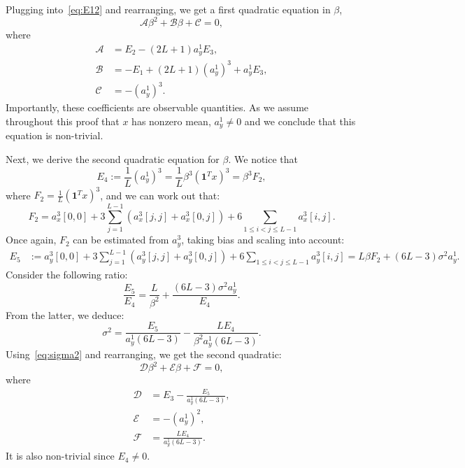 \documentclass[12pt]{article}
\newcommand{\1}{\mathbf{1}}
\newcommand{\one}{\mathbf{1}}
\theoremstyle{plain}
\theoremstyle{definition}
\theoremstyle{remark}
\theoremstyle{plain}
\theoremstyle{remark}
\theoremstyle{plain}
\theoremstyle{plain}
\begin{document}
Plugging into~\eqref{eq:E12} and rearranging, we get a first quadratic equation in $\beta$,
\begin{equation} \label{eq:quad1}
\mathcal{A}\beta^2 + \mathcal{B}\beta + \mathcal{C} = 0,
\end{equation}
where 
\begin{align*}
\mathcal{A} &= E_2 - (2L+1)a_y^1E_3, \\ 
\mathcal{B} &= -E_1 + (2L+1)(a_y^1)^3 + a_y^1E_3  , \\
\mathcal{C} &= -(a_y^1)^3.
\end{align*}
Importantly, these coefficients are observable quantities. As we assume throughout this proof that $x$ has nonzero mean, $a_y^1 \neq 0$ and we conclude that this equation is non-trivial.

Next, we derive the second quadratic equation for $\beta$. We notice that 
\begin{equation} \label{eq:E3}
E_4 := \frac{1}{L}(a_y^1)^3 = \frac{1}{L}\beta^3 (\one ^Tx)^3   = \beta^3 F_2,
\end{equation}
where $F_2 = \frac{1}{L}(\one ^Tx)^3$, and we can work out that:
\begin{equation*}
F_2 = a_x^3[0,0] + 3\sum_{j=1}^{L-1} \left(a_x^3[j,j] + a_x^3[0,j]\right) + 6\sum_{1\leq i < j\leq L-1}a_x^3[i,j].
\end{equation*}
Once again, $F_2$ can be estimated from $a_y^3$, taking bias and scaling into account:
\begin{align}
E_5 & := a_y^3[0,0] + 3\sum_{j=1}^{L-1} \left(a_y^3[j,j] + a_y^3[0,j]\right) + 6\sum_{1\leq i < j\leq L-1}a_y^3[i,j]  = L \beta F_2 + (6L-3)\sigma^2a_y^1.
\end{align}
Consider the following ratio:
\begin{equation*} 
\frac{E_5}{E_4} = \frac{L}{\beta^2} + \frac{(6L-3)\sigma^2a_y^1}{E_4}.
\end{equation*}
From the latter, we deduce:
\begin{equation*}
\sigma^2 = \frac{E_5}{a_y^1(6L-3)}  - \frac{LE_4}{\beta^2a_y^1(6L-3)}.
\end{equation*}
Using~\eqref{eq:sigma2} and rearranging, we get the second quadratic:
\begin{equation} \label{eq:quad2}
\mathcal{D}\beta^2 + \mathcal{E}\beta + \mathcal{F} = 0,
\end{equation}
where
\begin{align*}
\mathcal{D} &= E_3 - \frac{E_5}{a_y^1(6L-3)}, \\ 
\mathcal{E} &= -(a_y^1)^2, \\
\mathcal{F} &= \frac{LE_4}{a_y^1(6L-3)}.
\end{align*}
It is also non-trivial since $E_4 \neq 0$.
\end{document}
